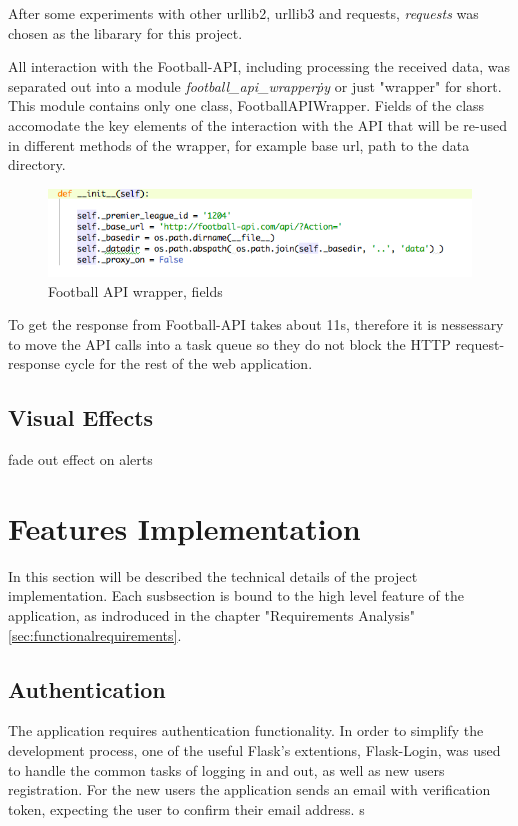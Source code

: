 After some experiments with other urllib2, urllib3 and requests, \emph{requests} was chosen as the libarary for this project.
		
All interaction with the Football-API, including processing the received data, was separated out into a module \emph{football\_api\_wrapper\.py} or just "wrapper" for short. This module contains only one class, FootballAPIWrapper. Fields of the class accomodate the key elements of the interaction with the API that will be re-used in different methods of the wrapper, for example base url, path to the data directory.
	
\begin{figure}[H]
\begin{center}
\includegraphics[width=.90\linewidth,natwidth=610,natheight=642]{impl/images/footballApiWrapperFields}
\caption{Football API wrapper, fields} \label{fig:using:footballapiwrapperfields}
\end{center}
\end{figure}
	
To get the response from Football-API takes about 11s, therefore it is nessessary to move the API calls into a task queue so they do not block the HTTP request-response cycle for the rest of the web application.

\subsection{Visual Effects}
fade out effect on alerts

\section{Features Implementation}
In this section will be described the technical details of the project implementation. Each susbsection is bound to the high level feature of the application, as indroduced in the chapter "Requirements Analysis" \ref{sec:functionalrequirements}.

\subsection{Authentication}

The application requires authentication functionality. In order to simplify the development process, one of the useful Flask's extentions, Flask-Login, was used to handle the common tasks of logging in and out, as well as new users registration. For the new users the application sends an email with verification token, expecting the user to confirm their email address. s

